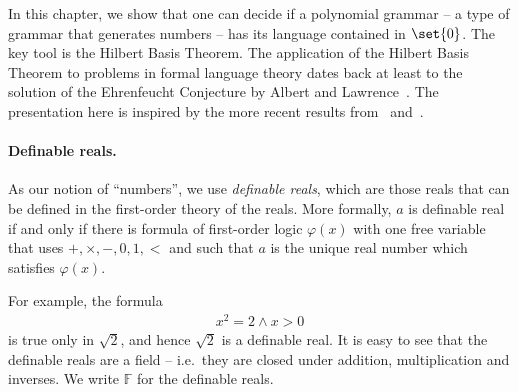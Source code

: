 
\newcommand{\definablereal}{\mathbb F}

In this chapter, we show that one can decide if a polynomial grammar -- a type of grammar that generates  numbers -- has its language contained in $\set{0}$. The key tool is the Hilbert Basis Theorem.
The application of the Hilbert Basis Theorem to problems in formal language theory dates back at least to the solution of the Ehrenfeucht Conjecture by Albert and Lawrence~\cite{Albert:1985eu}. The presentation here is inspired by the more recent results from~\cite{Seidl:2015ik} and~\cite{Benedikt:2017eq}.


\paragraph*{Definable reals.}
As our notion of ``numbers'', we use \emph{definable reals}, which are those reals that can be defined in the first-order theory of the reals. More formally, $a$ is definable real if and only if there is formula of first-order logic $\varphi(x)$ with one free variable that uses $+,\times,-,0,1,<$ and such that $a$ is the unique real number which satisfies $\varphi(x)$. 

For example, the formula
\begin{align*}
x^2 = 2 \land x > 0
\end{align*}
is true only in  $\sqrt 2$, and hence $\sqrt 2$ is a definable real. It is easy to see that the definable reals are a field -- i.e.~they are closed under addition, multiplication and inverses. We write $\definablereal$ for the definable reals. 

